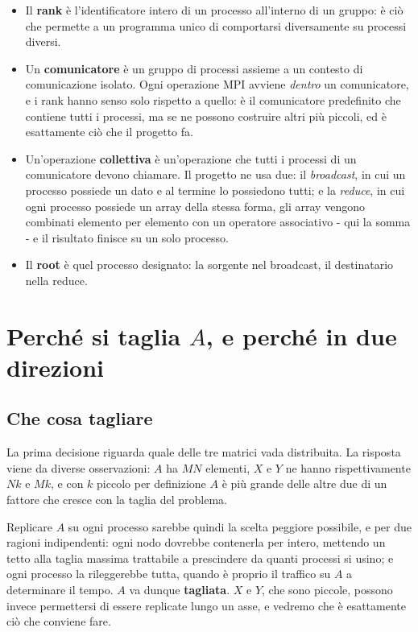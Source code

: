 \begin{itemize}[nosep,left=0pt]
  \item Il \textbf{rank} è l'identificatore intero di un processo all'interno
        di un gruppo: è ciò che permette a un programma unico di comportarsi
        diversamente su processi diversi.
  \item Un \textbf{comunicatore} è un gruppo di processi assieme a un contesto
        di comunicazione isolato. Ogni operazione MPI avviene \emph{dentro} un
        comunicatore, e i rank hanno senso solo rispetto a quello:
         è il comunicatore predefinito che contiene
        tutti i processi, ma se ne possono costruire altri più piccoli, ed è
        esattamente ciò che il progetto fa.
  \item Un'operazione \textbf{collettiva} è un'operazione che tutti i processi
        di un comunicatore devono chiamare. Il progetto ne usa due:
        il \emph{broadcast}, in cui un processo possiede un dato e al termine
        lo possiedono tutti; e la \emph{reduce}, in cui ogni processo possiede
        un array della stessa forma, gli array vengono combinati elemento per
        elemento con un operatore associativo - qui la somma - e il
        risultato finisce su un solo processo.
  \item Il \textbf{root} è quel processo designato: la sorgente nel broadcast,
        il destinatario nella reduce.
\end{itemize}

\section{Perché si taglia \texorpdfstring{$A$}{A}, e perché in due direzioni}
\label{sec:perche-2d}

\subsection{Che cosa tagliare}

La prima decisione riguarda quale delle tre matrici vada distribuita. La
risposta viene da diverse osservazioni: $A$ ha $MN$ elementi, $X$ e $Y$ ne
hanno rispettivamente $Nk$ e $Mk$, e con $k$ piccolo per definizione $A$ è più
grande delle altre due di un fattore che cresce con la taglia del problema.

Replicare $A$ su ogni processo sarebbe quindi la scelta peggiore possibile, e
per due ragioni indipendenti: ogni nodo dovrebbe contenerla per intero,
mettendo un tetto alla taglia massima trattabile a prescindere da quanti
processi si usino; e ogni processo la rileggerebbe tutta, quando è proprio il
traffico su $A$ a determinare il tempo. $A$ va dunque \textbf{tagliata}. $X$ e
$Y$, che sono piccole, possono invece permettersi di essere replicate lungo un
asse, e vedremo che è esattamente ciò che conviene fare.

